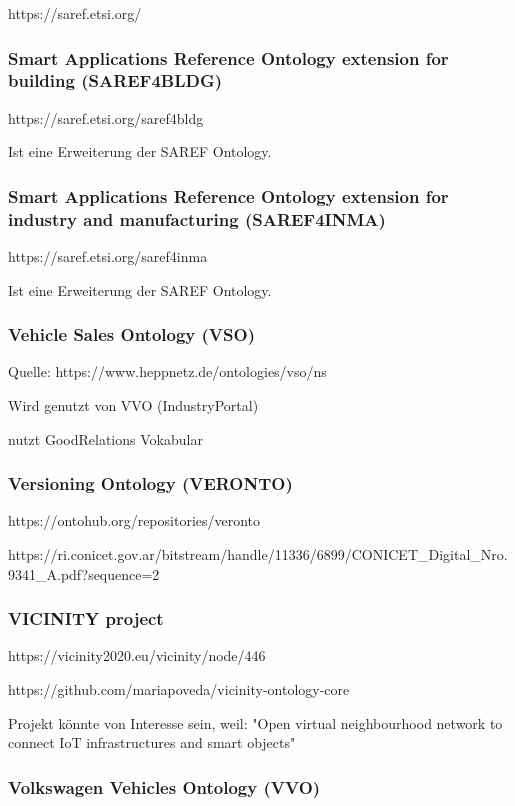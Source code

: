 \documentclass{article}
\begin{document}
https://saref.etsi.org/

\subsubsection{Smart Applications Reference Ontology extension for building (SAREF4BLDG)}

https://saref.etsi.org/saref4bldg

Ist eine Erweiterung der SAREF Ontology.

\subsubsection{Smart Applications Reference Ontology extension for industry and manufacturing (SAREF4INMA)}

https://saref.etsi.org/saref4inma

Ist eine Erweiterung der SAREF Ontology.

\subsubsection{Vehicle Sales Ontology (VSO)}

Quelle: https://www.heppnetz.de/ontologies/vso/ns

Wird genutzt von VVO (IndustryPortal)

nutzt GoodRelations Vokabular

\subsubsection{Versioning Ontology (VERONTO)}

https://ontohub.org/repositories/veronto

https://ri.conicet.gov.ar/bitstream/handle/11336/6899/CONICET\_Digital\_Nro.9341\_A.pdf?sequence=2

\subsubsection{VICINITY project}

https://vicinity2020.eu/vicinity/node/446

https://github.com/mariapoveda/vicinity-ontology-core

Projekt könnte von Interesse sein, weil: "Open virtual neighbourhood network to connect IoT infrastructures and smart objects"

\subsubsection{Volkswagen Vehicles Ontology (VVO)}
\end{document}
